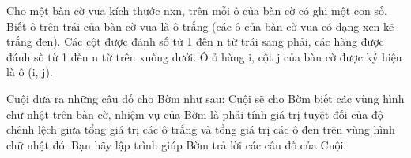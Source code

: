 Cho một bàn cờ vua kích thước nxn, trên mỗi ô của bàn cờ có ghi một con số. Biết ô trên trái của bàn cờ vua là ô trắng (các ô của bàn cờ vua có dạng xen kẽ trắng đen). Các cột được đánh số từ 1 đến n từ trái sang phải, các hàng được đánh số từ 1 đến n từ trên xuống dưới. Ô ở hàng i, cột j của bàn cờ được ký hiệu là ô (i, j).

Cuội đưa ra những câu đố cho Bờm như sau: Cuội sẽ cho Bờm biết các vùng hình chữ nhật trên bàn cờ, nhiệm vụ của Bờm là phải tính giá trị tuyệt đối của độ chênh lệch giữa tổng giá trị các ô trắng và tổng giá trị các ô đen trên vùng hình chữ nhật đó. Bạn hãy lập trình giúp Bờm trả lời các câu đố của Cuội.
